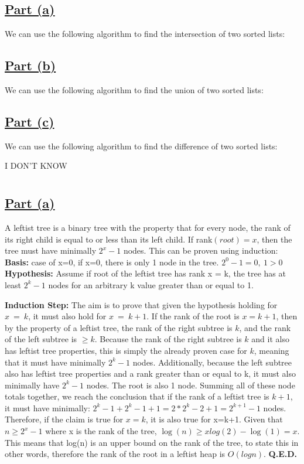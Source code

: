 \documentclass{article}
\begin{document}
\subsection*{\underline{Part (a)}}
We can use the following algorithm to find the intersection of two sorted lists:

\subsection*{\underline{Part (b)}}
We can use the following algorithm to find the union of two sorted lists:

\subsection*{\underline{Part (c)}}
We can use the following algorithm to find the difference of two sorted lists:

I DON'T KNOW
\newpage
\section{}
\subsection*{\underline{Part (a)}}
A leftist tree is a binary tree with the property that for every node, the rank of its right child is equal to or less than its left child. If rank$(root) = x$, then the tree must have minimally $2^x-1$ nodes. This can be proven using induction:
\textbf{Basis:} case of x=0, if x=0, there is only 1 node in the tree. $2^0-1=0,\ 1>0$
\textbf{Hypothesis:} Assume if root of the leftist tree has rank x = k, the tree has at least $2^k-1$ nodes for an arbitrary k value greater than or equal to 1.

\textbf{Induction Step:} The aim is to prove that given the hypothesis holding for $x\ =\ k$, it must also hold for $x\ =\ k+1$.
If the rank of the root is $x = k+1$, then by the property of a leftist tree, the rank of the right subtree is $k$, and the rank of the left subtree is $\geq k$. Because the rank of the right subtree is $k$ and it also has leftist tree properties, this is simply the already proven case for $k$, meaning that it must have minimally $2^k-1$ nodes. Additionally, because the left subtree also has leftist tree properties and a rank greater than or equal to k, it must also minimally have $2^k-1$ nodes. The root is also 1 node.
Summing all of these node totals together, we reach the conclusion that if the rank of a leftist tree is $k+1$, it must have minimally: $2^k-1+2^k-1+1=2\ast2^k-2+1=2^{k+1}-1$ nodes. Therefore, if the claim is true for $x=k$, it is also true for x=k+1.
Given that $n\geq2^x-1$ where x is the rank of the tree, $\log{\left(n\right)}\geq xlog\left(2\right)-\log{\left(1\right)}=x$. This means that log(n) is an upper bound on the rank of the tree, to state this in other words, therefore the rank of the root in a leftist heap is $O(logn)$. \textbf{Q.E.D.}
\end{document}
